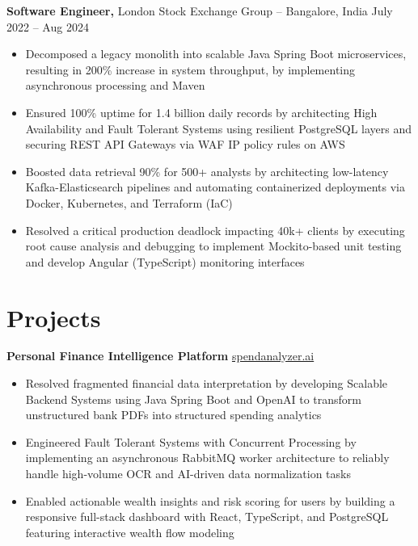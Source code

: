 \documentclass[11pt]{article}       %
\begin{document}
\textbf{Software Engineer,} {London Stock Exchange Group} -- Bangalore, India \hfill July 2022 -- Aug 2024 \\
\vspace{-9pt}
\begin{itemize}
  \item Decomposed a legacy monolith into scalable Java Spring Boot microservices, resulting in 200\% increase in system throughput, by implementing asynchronous processing and Maven
  \item Ensured 100\% uptime for 1.4 billion daily records by architecting High Availability and Fault Tolerant Systems using resilient PostgreSQL layers and securing REST API Gateways via WAF IP policy rules on AWS
  \item Boosted data retrieval 90\% for 500+ analysts by architecting low-latency Kafka-Elasticsearch pipelines and automating containerized deployments via Docker, Kubernetes, and Terraform (IaC)
  \item Resolved a critical production deadlock impacting 40k+ clients by executing root cause analysis and debugging to implement Mockito-based unit testing and develop Angular (TypeScript) monitoring interfaces
\end{itemize}

\vspace{-18.5pt}

\section*{Projects}

\textbf{Personal Finance Intelligence Platform} \hfill \href{https://spend-analyzer-coral.vercel.app/login/demo}{spendanalyzer.ai} \\
\vspace{-9pt}
\begin{itemize}
  \item Resolved fragmented financial data interpretation by developing Scalable Backend Systems using Java Spring Boot and OpenAI to transform unstructured bank PDFs into structured spending analytics
  \item Engineered Fault Tolerant Systems with Concurrent Processing by implementing an asynchronous RabbitMQ worker architecture to reliably handle high-volume OCR and AI-driven data normalization tasks
  \item Enabled actionable wealth insights and risk scoring for users by building a responsive full-stack dashboard with React, TypeScript, and PostgreSQL featuring interactive wealth flow modeling
\end{itemize}
\end{document}
